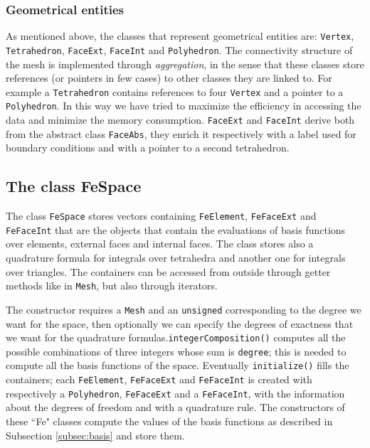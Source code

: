 \documentclass[12pt, a4paper]{article}
\theoremstyle{definition}
\theoremstyle{plain}
\theoremstyle{plain}
\theoremstyle{definition}
\begin{document}
\subsubsection{Geometrical entities}
As mentioned above, the classes that represent geometrical entities are: \lstinline|Vertex|, \lstinline|Tetrahedron|, \lstinline|FaceExt|, \lstinline|FaceInt| and \lstinline|Polyhedron|. The connectivity structure of the mesh is implemented through \emph{aggregation}, in the sense that these classes store references (or pointers in few cases) to other classes they are linked to. For example a \lstinline|Tetrahedron| contains references to four \lstinline|Vertex| and a pointer to a \lstinline|Polyhedron|. In this way we have tried to maximize the efficiency in accessing the data and minimize the memory consumption. \lstinline|FaceExt| and \lstinline|FaceInt| derive both from the abstract class \lstinline|FaceAbs|, they enrich it respectively with a label used for boundary conditions and with a pointer to a second tetrahedron.
\subsection{The class FeSpace}

The class \lstinline|FeSpace| stores vectors containing \lstinline|FeElement|, \lstinline|FeFaceExt| and \lstinline|FeFaceInt| that are the objects that contain the evaluations of basis functions over elements, external faces and internal faces. The class stores also a quadrature formula for integrals over tetrahedra and another one for integrals over triangles. The containers can be accessed from outside through getter methods like in \lstinline|Mesh|, but also through iterators.

The constructor requires a \lstinline|Mesh| and an \lstinline|unsigned| corresponding to the degree we want for the space, then optionally we can specify the degrees of exactness that we want for the quadrature formulas.\lstinline|integerComposition()| computes all the possible combinations of three integers whose sum is \lstinline|degree|; this is needed to compute all the basis functions of the space. Eventually \lstinline|initialize()| fills the containers; each \lstinline|FeElement|, \lstinline|FeFaceExt| and \lstinline|FeFaceInt| is created with respectively a \lstinline|Polyhedron|, \lstinline|FeFaceExt| and a \lstinline|FeFaceInt|, with the information about the degrees of freedom and with a quadrature rule. The constructors of these ``Fe" classes compute the values of the basis functions as described in Subsection \ref{subsec:basis} and store them.\\
\end{document}

